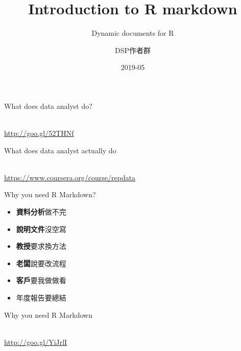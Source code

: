 \documentclass[ignorenonframetext,]{beamer}
\title{Introduction to R markdown}
\subtitle{Dynamic documents for R}
\author{DSP作者群}
\date{2019-05}
\providecommand{\tightlist}{%
  \setlength{\itemsep}{0pt}\setlength{\parskip}{0pt}}
\begin{document}
\frame{\titlepage}

\begin{frame}{What does data analyst do?}

\\
\url{http://goo.gl/52THNf}

\end{frame}

\begin{frame}{What does data analyst actually do}

\\
\url{https://www.coursera.org/course/repdata}

\end{frame}

\begin{frame}{Why you need R Markdown?}

\begin{itemize}
\tightlist
\item
  \textbf{資料分析}做不完\\
\item
  \textbf{說明文件}沒空寫\\
\item
  \textbf{教授}要求換方法\\
\item
  \textbf{老闆}說要改流程\\
\item
  \textbf{客戶}要我做做看\\
\item
  年度報告要總結
\end{itemize}

\end{frame}

\begin{frame}{Why you need R Markdown}

\\
\url{http://goo.gl/YiJrlI}

\end{frame}
\end{document}
